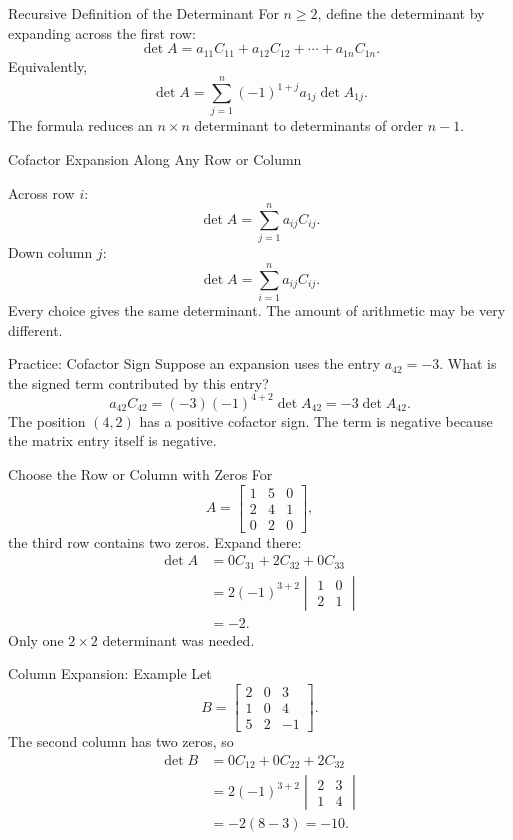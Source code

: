 \begin{frame}{Recursive Definition of the Determinant}
For $n\ge2$, define the determinant by expanding across the first row:
\[
\det A
=a_{11}C_{11}+a_{12}C_{12}+\cdots+a_{1n}C_{1n}.
\]
Equivalently,
\[
\boxed{\det A=\sum_{j=1}^{n}(-1)^{1+j}a_{1j}\det A_{1j}}.
\]
\pause
The formula reduces an $n\times n$ determinant to determinants of order $n-1$.
\end{frame}

\begin{frame}{Cofactor Expansion Along Any Row or Column}
\medskip

Across row $i$:
\[
\det A=\sum_{j=1}^{n}a_{ij}C_{ij}.
\]
Down column $j$:
\[
\det A=\sum_{i=1}^{n}a_{ij}C_{ij}.
\]
\pause
Every choice gives the same determinant. The amount of arithmetic may be very different.
\end{frame}

\begin{frame}{Practice: Cofactor Sign}
Suppose an expansion uses the entry $a_{42}=-3$.
What is the signed term contributed by this entry?
\pause
\[
a_{42}C_{42}
=(-3)(-1)^{4+2}\det A_{42}
=-3\det A_{42}.
\]
\pause
The position $(4,2)$ has a positive cofactor sign. The term is negative because the matrix entry itself is negative.
\end{frame}

\begin{frame}{Choose the Row or Column with Zeros}
For
\[
A=\begin{bmatrix}1&5&0\\2&4&1\\0&2&0\end{bmatrix},
\]
the third row contains two zeros. Expand there:
\begin{align*}
\det A
&=0C_{31}+2C_{32}+0C_{33}\\
&=2(-1)^{3+2}\begin{vmatrix}1&0\\2&1\end{vmatrix}\\
&=-2.
\end{align*}
\pause
Only one $2\times2$ determinant was needed.
\end{frame}

\begin{frame}{Column Expansion: Example}
Let
\[
B=\begin{bmatrix}
2&0&3\\
1&0&4\\
5&2&-1
\end{bmatrix}.
\]
The second column has two zeros, so
\begin{align*}
\det B
&=0C_{12}+0C_{22}+2C_{32}\\
&=2(-1)^{3+2}\begin{vmatrix}2&3\\1&4\end{vmatrix}\\
&=-2(8-3)=-10.
\end{align*}
\end{frame}

